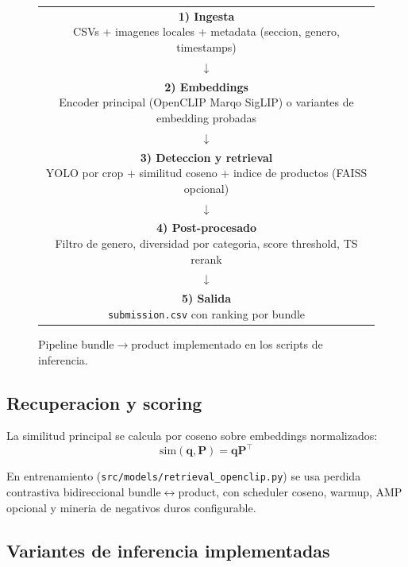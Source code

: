 \begin{figure}[h]
  \centering
  \small
  \begin{tabular}{c}
    \fbox{\parbox{0.92\linewidth}{\textbf{1) Ingesta}\\CSVs + imagenes locales + metadata (seccion, genero, timestamps)}}\\[2pt]
    $\downarrow$\\[2pt]
    \fbox{\parbox{0.92\linewidth}{\textbf{2) Embeddings}\\Encoder principal (OpenCLIP Marqo SigLIP) o variantes de embedding probadas}}\\[2pt]
    $\downarrow$\\[2pt]
    \fbox{\parbox{0.92\linewidth}{\textbf{3) Deteccion y retrieval}\\YOLO por crop + similitud coseno + indice de productos (FAISS opcional)}}\\[2pt]
    $\downarrow$\\[2pt]
    \fbox{\parbox{0.92\linewidth}{\textbf{4) Post-procesado}\\Filtro de genero, diversidad por categoria, score threshold, TS rerank}}\\[2pt]
    $\downarrow$\\[2pt]
    \fbox{\parbox{0.92\linewidth}{\textbf{5) Salida}\\\texttt{submission.csv} con ranking por bundle}}
  \end{tabular}
  \caption{Pipeline bundle$\rightarrow$product implementado en los scripts de inferencia.}
  \label{fig:end2end-flow}
\end{figure}

\subsection{Recuperacion y scoring}

La similitud principal se calcula por coseno sobre embeddings normalizados:
\begin{equation}
\mathrm{sim}(\mathbf{q}, \mathbf{P}) = \mathbf{q}\mathbf{P}^{\top}
\end{equation}

En entrenamiento (\texttt{src/models/retrieval\_openclip.py}) se usa perdida contrastiva bidireccional bundle$\leftrightarrow$product, con scheduler coseno, warmup, AMP opcional y mineria de negativos duros configurable.

\subsection{Variantes de inferencia implementadas}

